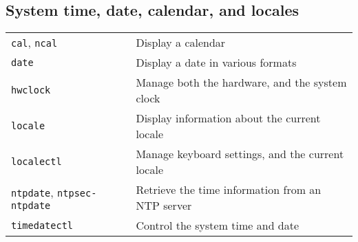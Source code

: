 \documentclass[10pt]{article}
\begin{document}
\begin{multicols}{2}
\section{System time, date, calendar, and locales}
\begin{tabular}{ p{2.5cm} p{8.5cm} }
  \hline
  \texttt{cal}, \texttt{ncal} & Display a calendar\\
  \texttt{date} & Display a date in various formats\\
  \texttt{hwclock} & Manage both the hardware, and the system clock\\
  \texttt{locale} & Display information about the current locale \\
  \texttt{localectl} & Manage keyboard settings, and the current locale \\
  \texttt{ntpdate}, \texttt{ntpsec-ntpdate} & Retrieve the time information from an NTP server \\
  \texttt{timedatectl} & Control the system time and date \\
  \hline
\end{tabular}
\end{multicols}

\newpage

\cheatsheet
\end{document}
